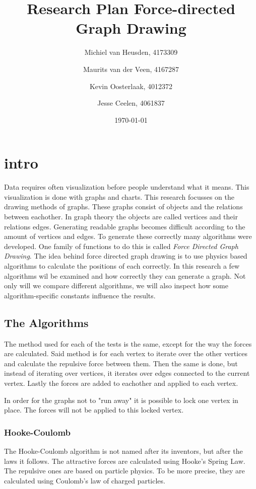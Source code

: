 \documentclass[a4paper,12pt]{article}
\title{Research Plan Force-directed Graph Drawing}
\author{
  Michiel van Heusden, 4173309 \and
  Maurits van der Veen, 4167287 \and
  Kevin Oosterlaak, 4012372 \and
  Jesse Ceelen, 4061837
  }
\date{\today}
\begin{document}
  \maketitle
  \tableofcontents
  \section{intro}
  Data requires often visualization before people understand what it means.
  This visualization is done with graphs and charts.
  This research focusses on the drawing methods of graphs.
  These graphs consist of objects and the relations between eachother.
  In graph theory the objects are called vertices and their relations edges.\cite{bondy1976graph}
  Generating readable graphs becomes difficult according to the amount of vertices and edges.
  To generate these correctly many algorithms were developed.
  One family of functions to do this is called \emph{Force Directed Graph Drawing}.
  The idea behind force directed graph drawing is to use physics based algorithms to calculate the positions of each correctly.
  In this research a few algorithms wil be examined and how correctly they can generate a graph.
  Not only will we compare different algorithms, we will also inspect how some algorithm-specific constants influence the results.

  \subsection{The Algorithms}\label{par:algorithms}
    The method used for each of the tests is the same,  except for the way the forces are calculated.
    Said method is for each vertex to iterate over the other vertices and calculate the repulsive force between them.
    Then the same is done, but instead of iterating over vertices, it iterates over edges connected to the current vertex.
    Lastly the forces are added to eachother and applied to each vertex.

    In order for the graphs not to "run away" it is possible to lock one vertex in place.
    The forces will not be applied to this locked vertex.

    \subsubsection{Hooke-Coulomb}
    The Hooke-Coulomb algorithm is not named after its inventors, but after the laws it follows.
    The attractive forces are calculated using Hooke's Spring Law.
    The repulsive ones are based on particle physics.
    To be more precise, they are calculated using Coulomb's law of charged particles.
\end{document}
